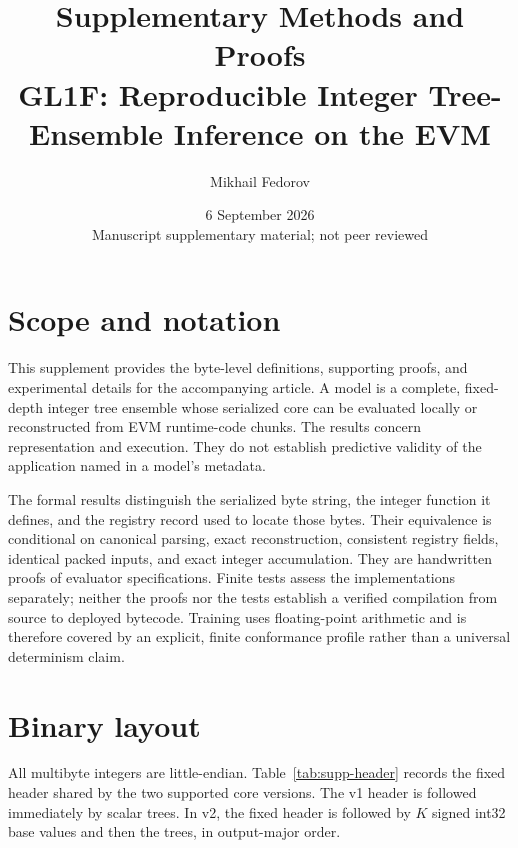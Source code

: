 \documentclass[10pt,a4paper]{article}
\title{Supplementary Methods and Proofs\\[5pt]
\large GL1F: Reproducible Integer Tree-Ensemble Inference on the EVM}
\author{Mikhail Fedorov}
\date{6 September 2026\\[3pt]\small Manuscript supplementary material; not peer reviewed}
\theoremstyle{remark}
\begin{document}
\maketitle

\section{Scope and notation}
\label{sec:supp-scope}

This supplement provides the byte-level definitions, supporting proofs, and
experimental details for the accompanying article. A model is a complete,
fixed-depth integer tree ensemble whose serialized core can be evaluated
locally or reconstructed from EVM runtime-code chunks. The results concern
representation and execution. They do not establish predictive validity of
the application named in a model's metadata.

The formal results distinguish the serialized byte string, the integer
function it defines, and the registry record used to locate those bytes.
Their equivalence is conditional on canonical parsing, exact reconstruction,
consistent registry fields, identical packed inputs, and exact integer
accumulation. They are handwritten proofs of evaluator specifications.
Finite tests assess the implementations separately; neither the proofs nor
the tests establish a verified compilation from source to deployed bytecode.
Training uses floating-point arithmetic and is therefore covered by an
explicit, finite conformance profile rather than a universal determinism
claim.

\section{Binary layout}
\label{sec:supp-layout}

All multibyte integers are little-endian. Table~\ref{tab:supp-header} records
the fixed header shared by the two supported core versions. The v1 header is
followed immediately by scalar trees. In v2, the fixed header is followed by
$K$ signed int32 base values and then the trees, in output-major order.
\end{document}
